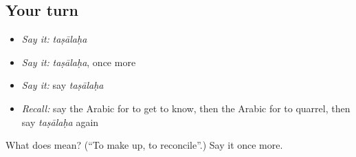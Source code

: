 \subsection*{Your turn}
\begin{itemize}
\raggedright
  \item \emph{Say it:} \emph{taṣālaḥa}
  \item \emph{Say it:} \emph{taṣālaḥa}, once more
  \item \emph{Say it:} say \emph{taṣālaḥa}
  \item \emph{Recall:} say the Arabic for to get to know, then the Arabic for to quarrel, then say \emph{taṣālaḥa} again
\end{itemize}

\begin{tcolorbox}[breakable,colback=teal!4,colframe=teal!35!black,title={Before you move on}]
What does  mean? (\textquotedblleft{}To make up, to reconcile\textquotedblright{}.) Say it once more.
\end{tcolorbox}
